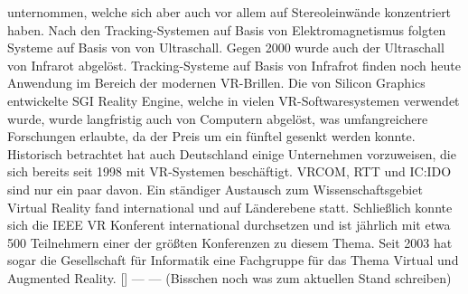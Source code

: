 \documentclass[a4paper,12pt,oneside]{article}
\begin{document}
        unternommen, welche sich aber auch vor allem auf Stereoleinwände konzentriert haben.
        Nach den Tracking-Systemen auf Basis von Elektromagnetismus folgten Systeme auf
        Basis von von Ultraschall. Gegen 2000 wurde auch der Ultraschall von Infrarot
        abgelöst. Tracking-Systeme auf Basis von Infrafrot finden noch heute Anwendung im
        Bereich der modernen VR-Brillen.
        Die von Silicon Graphics entwickelte SGI Reality Engine, welche in vielen
        VR-Softwaresystemen verwendet wurde, wurde langfristig auch von Computern
        abgelöst, was umfangreichere Forschungen erlaubte, da der Preis um ein fünftel
        gesenkt werden konnte.
        Historisch betrachtet hat auch Deutschland einige Unternehmen vorzuweisen, die sich
        bereits seit 1998 mit VR-Systemen beschäftigt. VRCOM, RTT und IC:IDO sind nur ein
        paar davon.
        Ein ständiger Austausch zum Wissenschaftsgebiet Virtual Reality fand international
        und auf Länderebene statt. Schließlich konnte sich die IEEE VR Konferent
        international durchsetzen und ist jährlich mit etwa 500 Teilnehmern einer der
        größten Konferenzen zu diesem Thema.
        Seit 2003 hat sogar die Gesellschaft für Informatik eine Fachgruppe für das Thema
        Virtual und Augmented Reality. [\cite[19-21]{Dorner2019}]
        --- --- (Bisschen noch was zum aktuellen Stand schreiben)
\end{document}
